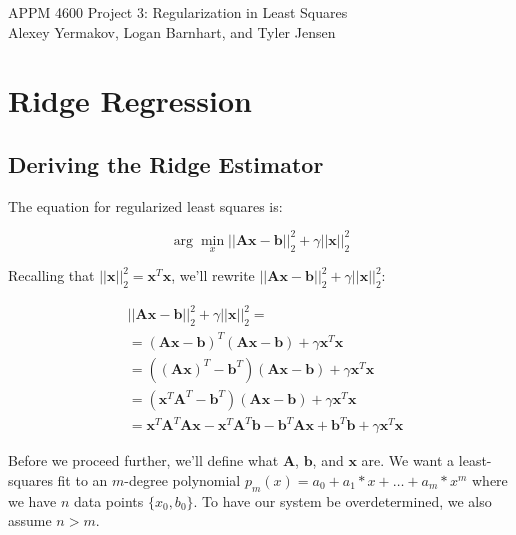 \documentclass{article}
\newcommand{\x}{\mathbf{x}}
\newcommand{\A}{\mathbf{A}}
\newcommand{\B}{\mathbf{b}} %
\begin{document}
APPM 4600 Project 3: Regularization in Least Squares\\
Alexey Yermakov, Logan Barnhart, and Tyler Jensen

\section{Ridge Regression}
\subsection{Deriving the Ridge Estimator}

The equation for regularized least squares is:

\begin{equation} \label{eqn:rls}
    \arg \min_{x} ||\A\x-\B||_{2}^{2} + \gamma||\x||_{2}^{2}
\end{equation}

Recalling that $||\mathbf{x}||_{2}^{2}=\mathbf{x}^T \mathbf{x}$, we'll rewrite $||\mathbf{Ax}-\mathbf{b}||_{2}^{2} + \gamma||\mathbf{x}||_{2}^{2}$:

\begin{equation*}
\begin{split}
    & ||\A\x-\B||_{2}^{2} + \gamma||\x||_{2}^{2} =\\
    & =  (\A\x - \B)^T (\A\x - \B) + \gamma \x^T \x \\ 
    & =  ((\A\x)^T - \B^T) (\A\x - \B) + \gamma \x^T \x \\ 
    & =  (\x^T\A^T - \B^T) (\A\x - \B) + \gamma \x^T \x \\ 
    & = \x^T \A^T \A\x - \x^T \A^T \B - \B^T \A\x + \B^T \B + \gamma \x^T \x
\end{split}
\end{equation*}

Before we proceed further, we'll define what $\A$, $\B$, and $\x$ are. We want a least-squares fit to an $m$-degree polynomial $p_m(x)=a_0+a_1*x+\ldots+a_m*x^m$ where we have $n$ data points $\{x_0,b_0\}$. To have our system be overdetermined, we also assume $n > m$.
\end{document}
